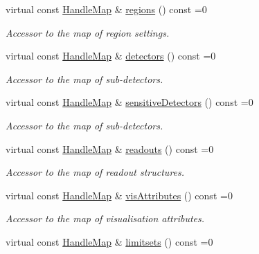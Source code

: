 \begin{DoxyCompactItemize}
virtual const \hyperlink{class_d_d4hep_1_1_geometry_1_1_l_c_d_d_a05cb11e7355772c7b0794bcca59bf477}{Handle\+Map} \& \hyperlink{class_d_d4hep_1_1_geometry_1_1_l_c_d_d_ab068e5aaa1d76a2348ea74ea3d76f96f}{regions} () const =0
\begin{DoxyCompactList}\small\item\em Accessor to the map of region settings. \end{DoxyCompactList}\item 
virtual const \hyperlink{class_d_d4hep_1_1_geometry_1_1_l_c_d_d_a05cb11e7355772c7b0794bcca59bf477}{Handle\+Map} \& \hyperlink{class_d_d4hep_1_1_geometry_1_1_l_c_d_d_ad06f71146140dc2682bc586ba7bffeaf}{detectors} () const =0
\begin{DoxyCompactList}\small\item\em Accessor to the map of sub-\/detectors. \end{DoxyCompactList}\item 
virtual const \hyperlink{class_d_d4hep_1_1_geometry_1_1_l_c_d_d_a05cb11e7355772c7b0794bcca59bf477}{Handle\+Map} \& \hyperlink{class_d_d4hep_1_1_geometry_1_1_l_c_d_d_a576c24cc18698eb14658466999fca65d}{sensitive\+Detectors} () const =0
\begin{DoxyCompactList}\small\item\em Accessor to the map of sub-\/detectors. \end{DoxyCompactList}\item 
virtual const \hyperlink{class_d_d4hep_1_1_geometry_1_1_l_c_d_d_a05cb11e7355772c7b0794bcca59bf477}{Handle\+Map} \& \hyperlink{class_d_d4hep_1_1_geometry_1_1_l_c_d_d_a5c815f21643ebb5cce9d1d1e71772431}{readouts} () const =0
\begin{DoxyCompactList}\small\item\em Accessor to the map of readout structures. \end{DoxyCompactList}\item 
virtual const \hyperlink{class_d_d4hep_1_1_geometry_1_1_l_c_d_d_a05cb11e7355772c7b0794bcca59bf477}{Handle\+Map} \& \hyperlink{class_d_d4hep_1_1_geometry_1_1_l_c_d_d_abb60505e37d62147725d126cb21d171b}{vis\+Attributes} () const =0
\begin{DoxyCompactList}\small\item\em Accessor to the map of visualisation attributes. \end{DoxyCompactList}\item 
virtual const \hyperlink{class_d_d4hep_1_1_geometry_1_1_l_c_d_d_a05cb11e7355772c7b0794bcca59bf477}{Handle\+Map} \& \hyperlink{class_d_d4hep_1_1_geometry_1_1_l_c_d_d_aeacdfb972606fef31bc1b69e6e982956}{limitsets} () const =0

\end{DoxyCompactItemize}

